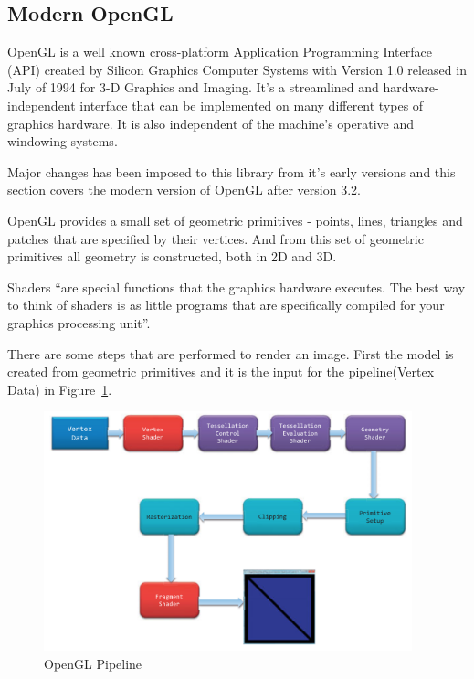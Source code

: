 
\subsection{Modern OpenGL} %
\label{sub:modern_opengl}


OpenGL is a well known cross-platform Application Programming Interface (API) created by Silicon Graphics Computer Systems with Version 1.0 released in July of 1994 for 3-D Graphics and Imaging. It's a streamlined and hardware-independent interface that can be implemented on many different types of graphics hardware. It is also independent of the machine's operative and windowing systems.

Major changes has been imposed to this library from it's early versions and this section covers the modern version of OpenGL after version 3.2.

OpenGL provides a small set of geometric primitives - points, lines, triangles and patches that are specified by their vertices. And from this set of geometric primitives all geometry is constructed, both in 2D and 3D. 

Shaders ``are special functions that the graphics hardware executes. The best way to think of shaders is as little programs that are specifically compiled for your graphics processing unit''. \cite{shreiner2013opengl}

There are some steps that are performed to render an image. First the model is created from geometric primitives and it is the input for the pipeline(Vertex Data) in Figure~\ref{fig:OGLPipeline}. 

\begin{figure}[htbp]
	\centering
	\includegraphics[width=0.95\textwidth]{img/OpenGL/pipeline.png}
	\caption{OpenGL Pipeline \cite{shreiner2013opengl}}
	\label{fig:OGLPipeline}
\end{figure}


